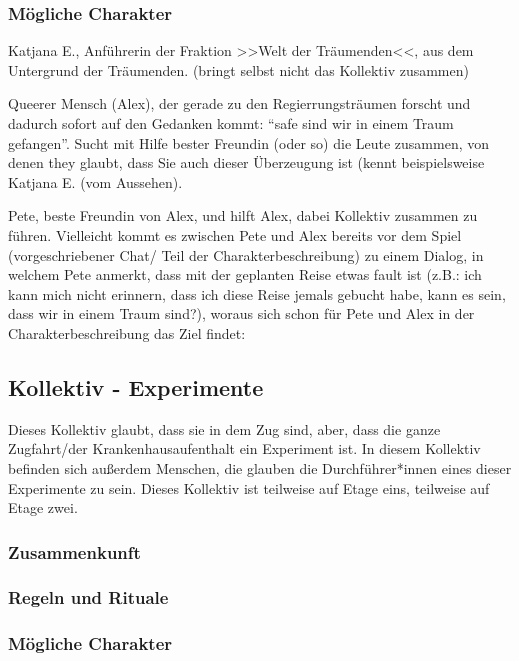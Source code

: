 \documentclass[12pt, a4paper, openany]{report}
\let\tempone\itemize
\let\temptwo\enditemize
\renewenvironment{itemize}{\tempone\addtolength{\itemsep}{-0.5\baselineskip}}{\temptwo}
\begin{document}
\subsubsection{Mögliche Charakter}
\begin{itemize}
  \item Katjana E., Anführerin der Fraktion >>Welt der Träumenden<<, aus dem
    Untergrund der Träumenden. (bringt selbst nicht das Kollektiv zusammen)
  \item Queerer Mensch (Alex), der gerade zu den Regierrungsträumen forscht und dadurch
    sofort auf den Gedanken kommt: ``safe sind wir in einem Traum gefangen''.
    Sucht mit Hilfe bester Freundin (oder so) die Leute zusammen, von denen they
    glaubt, dass Sie auch dieser Überzeugung ist (kennt beispielsweise Katjana
    E. (vom Aussehen).
  \item Pete, beste Freundin von Alex, und hilft Alex, dabei Kollektiv zusammen
    zu führen.
    Vielleicht kommt es zwischen Pete und Alex bereits vor dem Spiel
    (vorgeschriebener Chat/ Teil der Charakterbeschreibung) zu einem Dialog, in
    welchem Pete anmerkt, dass mit der geplanten Reise etwas fault ist (z.B.:
    ich kann mich nicht erinnern, dass ich diese Reise jemals gebucht habe, kann
    es sein, dass wir in einem Traum sind?), woraus sich schon für Pete und Alex
    in der Charakterbeschreibung das Ziel findet: 
\end{itemize}


\subsection{Kollektiv - Experimente}
Dieses Kollektiv glaubt, dass sie in dem Zug sind, aber, dass die ganze Zugfahrt/der Krankenhausaufenthalt ein Experiment ist. 
In diesem Kollektiv befinden sich außerdem Menschen, die glauben die Durchführer*innen eines dieser Experimente zu sein.
Dieses Kollektiv ist teilweise auf Etage eins, teilweise auf Etage zwei.\\
\subsubsection{Zusammenkunft}
\subsubsection{Regeln und Rituale}
\subsubsection{Mögliche Charakter}
\end{document}

